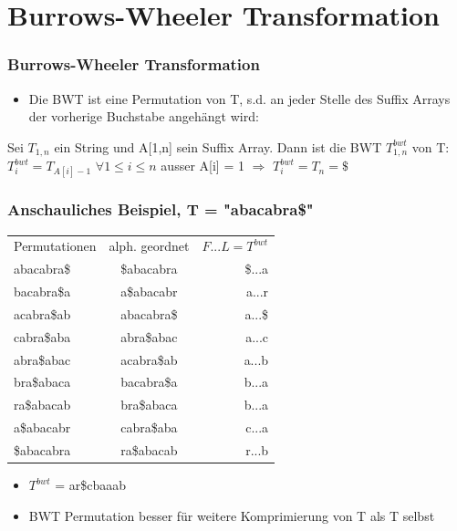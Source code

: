 \documentclass{beamer}
\begin{document}
\section{Burrows-Wheeler Transformation}
\begin{frame}
\frametitle{Burrows-Wheeler Transformation}
\begin{itemize}
\item Die BWT ist eine Permutation von T, s.d. an jeder Stelle des Suffix Arrays der vorherige Buchstabe angeh\"angt wird:
\end{itemize}
\begin{Definition}
Sei $T_{1,n}$ ein String und A[1,n] sein Suffix Array. Dann ist die BWT $T_{1,n}^{bwt}$ von T: \newline $T_{i}^{bwt} = T_{A[i]-1}$ $\forall 1 \leq i \leq n$ ausser A[i] = 1 $\Rightarrow$ $T_{i}^{bwt} = T_n = \$ $
\end{Definition}
\end{frame}
\begin{frame}
\frametitle{Anschauliches Beispiel, T = "abacabra\$"}
\begin{tabular}{l c r}
Permutationen & alph. geordnet & $F...L = T^{bwt}$ \\
abacabra\$ & \$abacabra & \$...a \\
bacabra\$a & a\$abacabr & a...r \\
acabra\$ab & abacabra\$ & a...\$ \\
cabra\$aba & abra\$abac & a...c \\
abra\$abac & acabra\$ab & a...b \\
bra\$abaca & bacabra\$a & b...a \\
ra\$abacab & bra\$abaca & b...a \\
a\$abacabr & cabra\$aba & c...a \\
\$abacabra & ra\$abacab & r...b \\
\end{tabular}
\begin{itemize}
\item $T^{bwt}$ = ar\$cbaaab
\item BWT Permutation besser f\"ur weitere Komprimierung von T als T selbst
\end{itemize}
\end{frame}
\end{document}
